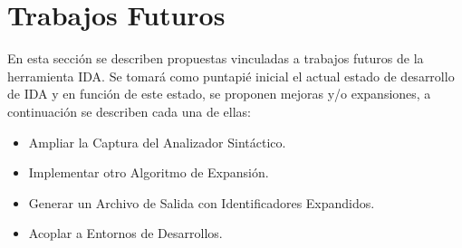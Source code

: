 
\pagebreak
\section{Trabajos Futuros}

En esta sección se describen propuestas vinculadas a trabajos futuros de la herramienta IDA. Se tomará como puntapié inicial el actual estado de desarrollo de IDA y en función de este estado, se proponen mejoras y/o expansiones, a continuación se describen cada una de ellas:

\begin{itemize}

\item Ampliar la Captura del Analizador Sintáctico.

\item Implementar otro Algoritmo de Expansión.

\item Generar un Archivo de Salida con Identificadores Expandidos.

\item Acoplar a Entornos de Desarrollos.

\end{itemize}

